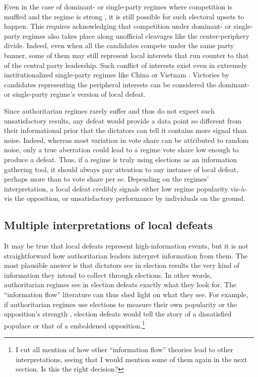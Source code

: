 \documentclass[12pt]{article}\usepackage[]{graphicx}\usepackage[]{color}
\newcommand{\1}{\mathbbm{1}}
\begin{document}
Even in the case of dominant- or single-party regimes where competition is muffled \citep{Schedler2002} and the regime is strong \citep{BunceWolchik2010}, it is still possible for such electoral upsets to happen. This requires acknowledging that competition under dominant- or single-party regimes also takes place along unofficial cleavages like the center-periphery divide. Indeed, even when all the candidates compete under the same party banner, some of them may still represent local interests that run counter to that of the central party leadership. Such conflict of interests exist even in extremely institutionalized single-party regimes like China \citep{Manion2014} or Vietnam \citep{MaleskySchuler2011}. Victories by candidates representing the peripheral interests can be considered the dominant- or single-party regime's version of local defeat.
	
Since authoritarian regimes rarely suffer and thus do not expect such unsatisfactory results, any defeat would provide a data point so different from their informational prior that the dictators can tell it contains more signal than noise. Indeed, whereas most variation in vote share can be attributed to random noise, only a true aberration could lead to a regime vote share low enough to produce a defeat. Thus, if a regime is truly using elections as an information gathering tool, it should always pay attention to any instance of local defeat, perhaps more than to vote share per se. Depending on the regimes' interpretation, a local defeat credibly signals either low regime popularity vis-\`{a}-vis the opposition, or unsatisfactory performance by individuals on the ground.

\subsection{Multiple interpretations of local defeats}
It may be true that local defeats represent high-information events, but it is not straightforward how authoritarian leaders interpret information from them. The most plausible answer is that dictators see in election results the very kind of information they intend to collect through elections. In other words, authoritarian regimes see in election defeats exactly what they look for. The ``information flow'' literature can thus shed light on what they see. For example, if authoritarian regimes use elections to measure their own popularity \citep{Miller2015} or the opposition's strength \citep{Geddes2005}, election defeats would tell the story of a dissatisfied populace or that of a emboldened opposition.\footnote{I cut all mention of how other ``information flow'' theories lead to other interpretations, seeing that I would mention some of them again in the next section. Is this the right decision?}
\end{document}

